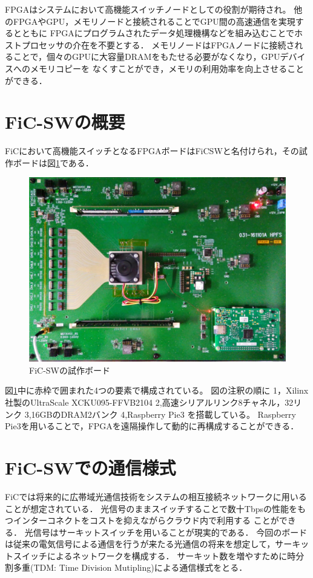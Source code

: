 {FPGAはシステムにおいて高機能スイッチノードとしての役割が期待され。
他のFPGAやGPU，メモリノードと接続されることでGPU間の高速通信を実現するとともに
FPGAにプログラムされたデータ処理機構などを組み込むことでホストプロセッサの介在を不要とする．
メモリノードはFPGAノードに接続されることで，個々のGPUに大容量DRAMをもたせる必要がなくなり，GPUデバイスへのメモリコピーを
なくすことができ，メモリの利用効率を向上させることができる．

\section{FiC-SWの概要}
\label{sec:about_ficsw}
FiCにおいて高機能スイッチとなるFPGAボードはFiCSWと名付けられ，その試作ボードは図\ref{fig:ficsw}である．

\begin{figure}[h]
  \centering
  \includegraphics[width=12cm]{./chap3/fig/ficsw.pdf}
  \caption{FiC-SWの試作ボード}
  \label{fig:ficsw}
\end{figure}

図\ref{fig:ficsw}中に赤枠で囲まれた4つの要素で構成されている。
図の注釈の順に
1，Xilinx社製のUltraScale XCKU095-FFVB2104
2,高速シリアルリンク8チャネル，32リンク
3,16GBのDRAM2バンク
4,Raspberry Pie3
を搭載している。
Raspberry Pie3を用いることで，FPGAを遠隔操作して動的に再構成することができる．

\section{FiC-SWでの通信様式}
\label{sec:ficsw_communication}
FiCでは将来的に広帯域光通信技術をシステムの相互接続ネットワークに用いることが想定されている．
光信号のままスイッチすることで数十Tbpsの性能をもつインターコネクトをコストを抑えながらクラウド内で利用する
ことができる．
光信号はサーキットスイッチを用いることが現実的である．
今回のボードは従来の電気信号による通信を行うが来たる光通信の将来を想定して，サーキットスイッチによるネットワークを構成する．
サーキット数を増やすために時分割多重(TDM: Time Division Mutipling)による通信様式をとる．

}
